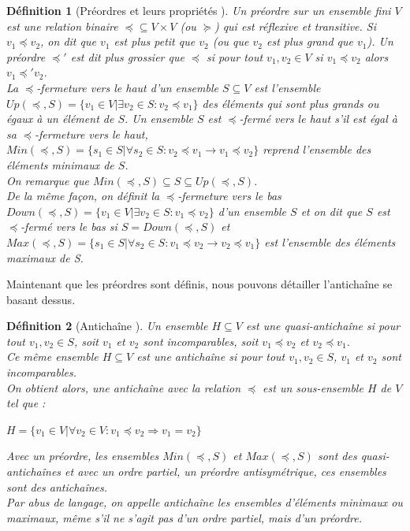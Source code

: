 \documentclass[12pt,a4paper,oneside]{book}
\theoremstyle{break}
\newtheorem{defin}{Définition}[chapter]
\theoremstyle{breakplain}
\begin{document}
\begin{defin}[Préordres et leurs propriétés \cite{doyen2010antichain}]
Un préordre sur un ensemble fini $V$ est une relation binaire $\preceq \subseteq V \times V$ (ou $\succeq$) qui est réflexive et transitive. Si $v_1 \preceq v_2$, on dit que $v_1$ est plus petit que $v_2$ (ou que $v_2$ est plus grand que $v_1$).
Un préordre $\preceq'$ est dit plus grossier que $\preceq$ si pour tout $v_1, v_2 \in V$ si $v_1 \preceq v_2$ alors $v_1 \preceq' v_2$.\\
La $\preceq$-fermeture vers le haut d'un ensemble $S \subseteq V$ est l'ensemble $Up(\preceq, S) = \{ v_1 \in V | \exists v_2 \in S : v_2 \preceq v_1 \}$ des éléments qui sont plus grands ou égaux à un élément de $S$.
Un ensemble $S$ est $\preceq$-fermé vers le haut s'il est égal à sa $\preceq$-fermeture vers le haut, $Min(\preceq, S) = \{s_1 \in S | \forall s_2 \in S : v_2 \preceq v_1 \rightarrow v_1 \preceq v_2 \}$ reprend l'ensemble des éléments minimaux de $S$.\\
On remarque que $Min(\preceq, S) \subseteq S \subseteq Up(\preceq, S)$.\\

De la même façon, on définit la $\preceq$-fermeture vers le bas $Down(\preceq, S) = \{ v_1 \in V | \exists v_2 \in S : v_1 \preceq v_2 \}$ d'un ensemble $S$ et on dit que $S$ est $\preceq$-fermé vers le bas si $S = Down(\preceq, S)$ et $Max(\preceq, S) = \{s_1 \in S | \forall s_2 \in S : v_1 \preceq v_2 \rightarrow v_2 \preceq v_1 \}$ est l'ensemble des éléments maximaux de S.

\end{defin}

Maintenant que les préordres sont définis, nous pouvons détailler l'antichaîne se basant dessus.

\begin{defin}[Antichaîne \cite{doyen2010antichain}]
Un ensemble $H \subseteq V$ est une quasi-antichaîne si pour tout $v_1 , v_2 \in S$, soit $v_1$ et $v_2$ sont incomparables, soit $ v_1 \preceq v_2$ et $v_2 \preceq v_1$.\\
Ce même ensemble $H \subseteq V$ est une antichaîne si pour tout $v_1 , v_2 \in S$, $v_1$ et $v_2$ sont incomparables.\\
On obtient alors, une antichaîne avec la relation $\preceq$ est un sous-ensemble $H$ de $V$ tel que :
\begin{center}
$H = \{v_1 \in V|\forall v_2 \in V : v_1 \preceq v_2 \Rightarrow v_1 = v_2\}$
\end{center}

Avec un préordre, les ensembles $Min(\preceq, S)$ et $Max(\preceq, S)$ sont des quasi-antichaînes et avec un ordre partiel, un préordre antisymétrique, ces ensembles sont des antichaînes.\\
Par abus de langage, on appelle antichaîne les ensembles d'éléments minimaux ou maximaux, même s'il ne s'agit pas d'un ordre partiel, mais d'un préordre.

\end{defin}
\end{document}
